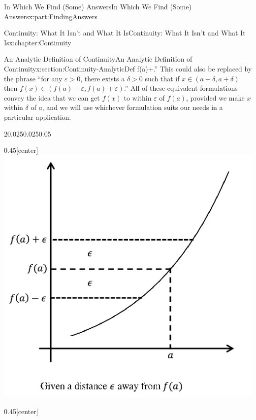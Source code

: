 \documentclass[oneside,10pt,]{book}
\numberwithin{equation}{section}
\newcommand{\eps}{\varepsilon}
\begin{document}
\begin{partptx}{In Which We Find (Some) Answers}{}{In Which We Find (Some) Answers}{}{}{x:part:FindingAnswers}
\begin{chapterptx}{Continuity: What It Isn't and What It Is}{}{Continuity: What It Isn't and What It Is}{}{}{x:chapter:Continuity}
\begin{sectionptx}{An Analytic Definition of Continuity}{}{An Analytic Definition of Continuity}{}{}{x:section:Continuity-AnalyticDef}
f(a)+\eps\).'' This could also be replaced by the phrase ``for any \(\eps>0\), there exists a \(\delta>0\) such that if \(x\in(a-\delta,a+\delta)\) then \(f(x)\in(f(a)-\eps,f(a)+\eps)\).'' All of these equivalent formulations convey the idea that we can get \(f(x)\) to within \(\eps\) of \(f(a)\), provided we make \(x\) within \(\delta\) of \(a\), and we will use whichever formulation suits our needs in a particular application.%
\begin{sidebyside}{2}{0.025}{0.025}{0.05}%
\begin{sbspanel}{0.45}[center]%
\includegraphics[width=\linewidth]{images/Ch5fig3a.png}
\end{sbspanel}%
\begin{sbspanel}{0.45}[center]%

\end{sbspanel}
\end{sidebyside}
\end{sectionptx}
\end{chapterptx}
\end{partptx}
\end{document}
